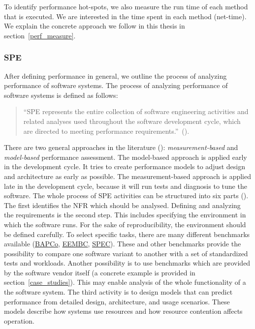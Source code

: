 To identify performance hot-spots, we also measure the run time of each method that is executed.
We are interested in the time spent in each method (net-time).
We explain the concrete approach we follow in this thesis in section~\ref{perf_measure}. 


\subsubsection{\ac{SPE}}

After defining performance in general, we outline the process of analyzing performance of software systems.
The process of analyzing performance of software systems is defined as follows:
\begin{quote}
``\ac{SPE} represents the entire collection of software engineering activities and related analyses used throughout the software development cycle, which are directed to meeting performance requirements.''~(\cite{woodside2007future}).
\end{quote}
There are two general approaches in the literature (\cite{woodside2007future}): \textit{measurement-based} and \textit{model-based} performance assessment. 
The model-based approach is applied early in the development cycle. 
It tries to create performance models to adjust design and architecture as early as possible. 
The measurement-based approach is applied late in the development cycle, because it will run tests and diagnosis to tune the software.
The whole process of \ac{SPE} activities can be structured into six parts (\cite{woodside2007future}). 
The first identifies the \ac{NFR} which should be analysed.
Defining and analyzing the requirements is the second step. 
This includes specifying the environment in which the software runs. 
For the sake of reproducibility, the environment should be defined carefully.  
To select specific tasks, there are many different benchmarks available (\href{https://bapco.com/}{BAPCo}, \href{https://www.eembc.org/}{EEMBC}, \href{http://www.spec.org/}{SPEC}). 
These and other benchmarks provide the possibility to compare one software variant to another with a set of standardized tests and workloads. 
Another possibility is to use benchmarks which are provided by the software vendor itself (a concrete example is provided in section~\ref{case_studies}). 
This may enable analysis of the whole functionality of a the software system.
The third activity is to design models that can predict performance from detailed design, architecture, and usage scenarios. 
These models describe how systems use resources and how resource contention affects operation. 
